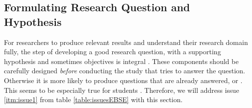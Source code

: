 \subsection{Formulating Research Question and Hypothesis}
\label{subsec:formulating research question and hypothesis}

For researchers to produce relevant results and understand their research domain fully, the step of developing a good research question, with a supporting hypothesis and sometimes objectives is integral \cite{Farrugia2009}. These components should be carefully designed \emph{before} conducting the study that tries to answer the question. Otherwise it is more likely to produce questions that are already answered, or  \cite[p. 280]{Farrugia2009}. This seems to be especially true for students \cite{Rainer2006}. Therefore, we will address issue \ref{itm:issue1} from table \ref{table:issuesEBSE} with this section. 

